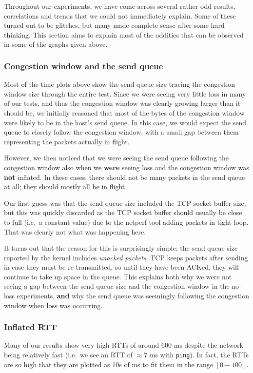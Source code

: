Throughout our experiments, we have come across several rather odd results,
correlations and trends that we could not immediately explain. Some of these
turned out to be glitches, but many made complete sense after some hard
thinking. This section aims to explain most of the oddities that can be observed
in some of the graphs given above.

\subsubsection{Congestion window and the send queue}
Most of the time plots above show the send queue size tracing the congestion
window size through the entire test. Since we were seeing very  little loss in
many of our tests, and thus the congestion window was clearly growing larger
than it should be, we initially reasoned that most of the bytes of the
congestion window were likely to be in the host's send queue. In this case, we
would expect the send queue to closely follow the congestion window, with a
small gap between them representing the packets actually in flight.

However, we then noticed that we were seeing the send queue following the
congestion window also when we \textbf{were} seeing loss and the congestion
window was \textbf{not} inflated. In these cases, there should not be many
packets in the send queue at all; they should mostly all be in flight.

Our first guess was that the send queue size included the TCP socket buffer
size, but this was quickly discarded as the TCP socket buffer should usually be
close to full (i.e.\ a constant value) due to the netperf tool adding packets in
tight loop. That was clearly not what was happening here.

It turns out that the reason for this is surprisingly simple; the send queue
size reported by the kernel includes \textit{unacked packets}. TCP keeps packets
after sending in case they must be re-transmitted, so until they have been
ACKed, they will continue to take up space in the queue. This explains both why
we were not seeing a gap between the send queue size and the congestion window
in the no-loss experiments, \textbf{and} why the send queue was seemingly
following the congestion window when loss was occurring.

\subsubsection{Inflated RTT}
Many of our results show very high RTTs of around 600 ms despite the network
being relatively fast (i.e.\ we see an RTT of $\approx 7$ ms with
\texttt{ping}). In fact, the RTTs are so high that they are plotted as 10s of ms
to fit them in the range $[0-100]$.


